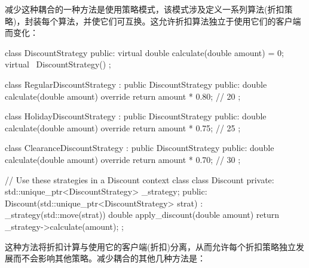 
减少这种耦合的一种方法是使用策略模式，该模式涉及定义一系列算法(折扣策略)，封装每个算法，并使它们可互换。这允许折扣算法独立于使用它们的客户端而变化：

\begin{cpp}
class DiscountStrategy {
public:
    virtual double calculate(double amount) = 0;
    virtual ~DiscountStrategy() {}
};

class RegularDiscountStrategy : public DiscountStrategy {
public:
    double calculate(double amount) override {
        return amount * 0.80; // 20%
    }
};

class HolidayDiscountStrategy : public DiscountStrategy {
public:
    double calculate(double amount) override {
        return amount * 0.75; // 25%
    }
};

class ClearanceDiscountStrategy : public DiscountStrategy {
public:
    double calculate(double amount) override {
        return amount * 0.70; // 30%
    }
};

// Use these strategies in a Discount context class
class Discount {
private:
    std::unique_ptr<DiscountStrategy> _strategy;
public:
    Discount(std::unique_ptr<DiscountStrategy> strat) : _strategy(std::move(strat)) {}
    double apply_discount(double amount) {
        return _strategy->calculate(amount);
    }
};
\end{cpp}

这种方法将折扣计算与使用它的客户端(折扣)分离，从而允许每个折扣策略独立发展而不会影响其他策略。减少耦合的其他几种方法是：

